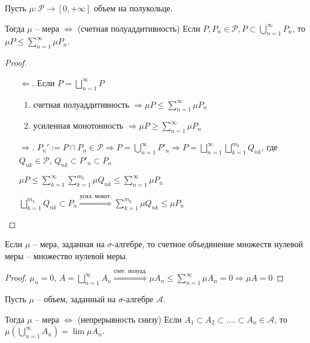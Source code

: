 \begin{theorem}
    Пусть $\mu: \mathcal{P} \rightarrow [0, +\infty]$ объем на полукольце. 
    
    Тогда $\mu $ – мера $\Leftrightarrow$ (счетная полуаддитивность) Если $P, P_n\in \mathcal{P}, P \subset\bigcup\limits_{n=1}^\infty P_n$, 
    то $\mu P \leq \sum\limits_{n=1}^\infty \mu P_n$.
\end{theorem}

\begin{proof}~
    \begin{enumerate}
        \item[$\Leftarrow$.] Если $P=\bigsqcup\limits_{n=1}^\infty P $
            \begin{enumerate}
                \item счетная полуаддитивность $\Rightarrow \mu P \leq \sum\limits_{n=1}^\infty \mu P_n$
                \item усиленная монотонность $\Rightarrow \mu P \geq \sum\limits_{n=1}^\infty \mu P_n$
            \end{enumerate}
        \item[$\Rightarrow$.] $P_n':= P \cap P_n \in \mathcal{P} \Rightarrow P = \bigcup\limits_{n=1}^\infty P'_n\Rightarrow 
        P = \bigsqcup\limits_{n=1}^\infty\bigsqcup\limits_{k=1}^{m_k}Q_{nk}$, где $Q_{nk}\in \mathcal{P}$, $Q_{nk} \subset P'_n \subset P_n$

        $\mu P \leq \sum\limits_{k=1}^\infty \sum\limits_{k=1}^{m_k} \mu Q_{nk} \leq \sum \limits_{n=1}^\infty \mu P_n$

        $\bigsqcup\limits_{k=1}^{m_k} Q_{nk}\subset P_n\overset{\text{усил. монот.}}{\Rightarrow}\sum\limits_{k=1}^{m_k}\mu Q_{nk}\leq \mu P_n$
    \end{enumerate}
\end{proof}

\begin{corollary}
     Если $\mu$ – мера, заданная на $\sigma$-алгебре, то счетное объединение
     множеств нулевой меры – множество нулевой меры.
\end{corollary}

\begin{proof}
    $\mu _n = 0$, $A=\bigsqcup\limits_{n=1}^\infty A_n\overset{\text{счет. полуад.}}{\Rightarrow} \mu A_n \leq \sum\limits_{n=1}^\infty \mu A_n=0\Rightarrow \mu A=0$
\end{proof}

\begin{theorem}
    Пусть $\mu$ – объем, заданный на $\sigma$-алгебре $\mathcal{A}$. 
    
    Тогда $\mu$ – мера $\Leftrightarrow$ (непрерывность снизу) Если $A_1 \subset A_2 \subset ....\subset A_n\in \mathcal{A}$,
    то $\mu (\bigcup\limits_{n=1}^\infty A_n) =\lim \mu A_n$.
\end{theorem}

